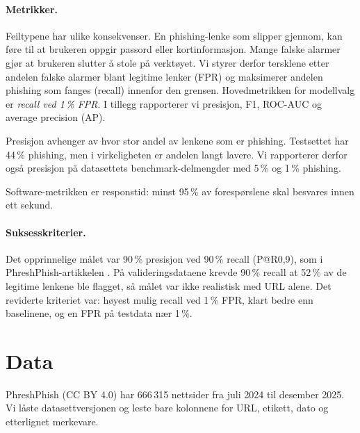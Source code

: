 \documentclass[11pt,a4paper]{article}
\begin{document}
\paragraph{Metrikker.} Feiltypene har ulike konsekvenser. En phishing-lenke som slipper gjennom, kan føre til at brukeren oppgir passord eller kortinformasjon. Mange falske alarmer gjør at brukeren slutter å stole på verktøyet. Vi styrer derfor tersklene etter andelen falske alarmer blant legitime lenker (FPR) og maksimerer andelen phishing som fanges (recall) innenfor den grensen. Hovedmetrikken for modellvalg er \emph{recall ved 1\,\% FPR}. I tillegg rapporterer vi presisjon, F1, ROC-AUC og average precision (AP).

Presisjon avhenger av hvor stor andel av lenkene som er phishing. Testsettet har 44\,\% phishing, men i virkeligheten er andelen langt lavere. Vi rapporterer derfor også presisjon på datasettets benchmark-delmengder med 5\,\% og 1\,\% phishing.

Software-metrikken er responstid: minst 95\,\% av forespørslene skal besvares innen ett sekund.

\paragraph{Suksesskriterier.} Det opprinnelige målet var 90\,\% presisjon ved 90\,\% recall (P@R0,9), som i PhreshPhish-artikkelen \cite{phreshphish}. På valideringsdataene krevde 90\,\% recall at 52\,\% av de legitime lenkene ble flagget, så målet var ikke realistisk med URL alene. Det reviderte kriteriet var: høyest mulig recall ved 1\,\% FPR, klart bedre enn baselinene, og en FPR på testdata nær 1\,\%.

\section{Data}

PhreshPhish \cite{datasetcard} (CC BY 4.0) har 666\,315 nettsider fra juli 2024 til desember 2025. Vi låste datasettversjonen og leste bare kolonnene for URL, etikett, dato og etterlignet merkevare.
\end{document}
